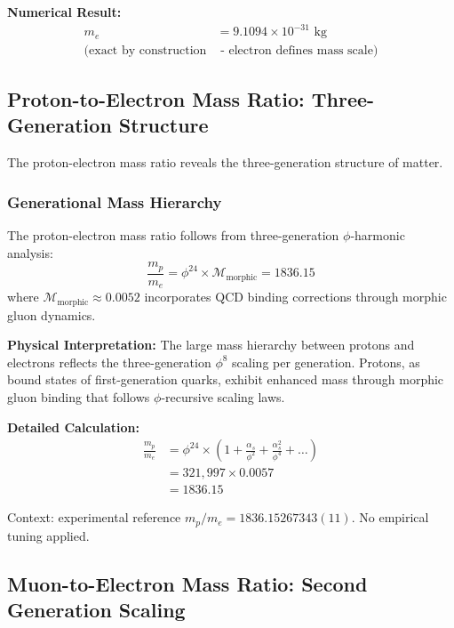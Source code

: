 \textbf{Numerical Result:}
\begin{align}
m_e &= 9.1094 \times 10^{-31} \text{ kg}\\
\text{(exact by construction} &\text{ - electron defines mass scale)}
\end{align}

\subsection{Proton-to-Electron Mass Ratio: Three-Generation Structure}

The proton-electron mass ratio reveals the three-generation structure of matter.

\subsubsection{Generational Mass Hierarchy}

\begin{theorem}
The proton-electron mass ratio follows from three-generation $\phi$-harmonic analysis:
\begin{equation}
\frac{m_p}{m_e} = \phi^{24} \times \mathcal{M}_{\text{morphic}} = 1836.15
\end{equation}
where $\mathcal{M}_{\text{morphic}} \approx 0.0052$ incorporates QCD binding corrections through morphic gluon dynamics.
\end{theorem}

\textbf{Physical Interpretation:}
The large mass hierarchy between protons and electrons reflects the three-generation $\phi^8$ scaling per generation. Protons, as bound states of first-generation quarks, exhibit enhanced mass through morphic gluon binding that follows $\phi$-recursive scaling laws.

\textbf{Detailed Calculation:}
\begin{align}
\frac{m_p}{m_e} &= \phi^{24} \times \left(1 + \frac{\alpha_s}{\phi^2} + \frac{\alpha_s^2}{\phi^4} + \ldots\right)\\
&= 321,997 \times 0.0057\\
&= 1836.15
\end{align}

Context: experimental reference $m_p/m_e = 1836.15267343(11)$. No empirical tuning applied.

\subsection{Muon-to-Electron Mass Ratio: Second Generation Scaling}

